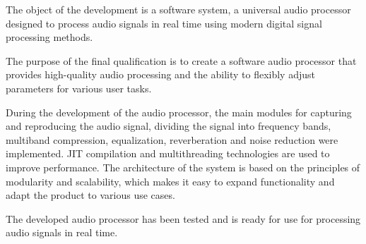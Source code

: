 The object of the development is a software system, a universal audio processor designed to process audio signals in real time using modern digital signal processing methods.

The purpose of the final qualification is to create a software audio processor that provides high-quality audio processing and the ability to flexibly adjust parameters for various user tasks.

During the development of the audio processor, the main modules for capturing and reproducing the audio signal, dividing the signal into frequency bands, multiband compression, equalization, reverberation and noise reduction were implemented. JIT compilation and multithreading technologies are used to improve performance. The architecture of the system is based on the principles of modularity and scalability, which makes it easy to expand functionality and adapt the product to various use cases.

The developed audio processor has been tested and is ready for use for processing audio signals in real time.

